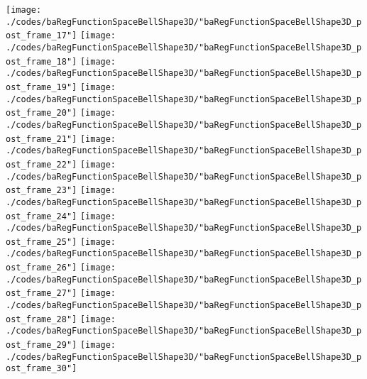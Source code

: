 \begin{frame}{\insertsection}
\begin{center}
{\begin{animateinline}{15}
				 \texttt{[image: ./codes/baRegFunctionSpaceBellShape3D/"baRegFunctionSpaceBellShape3D\_post\_frame\_17"]}\newframe
				 \texttt{[image: ./codes/baRegFunctionSpaceBellShape3D/"baRegFunctionSpaceBellShape3D\_post\_frame\_18"]}\newframe
				 \texttt{[image: ./codes/baRegFunctionSpaceBellShape3D/"baRegFunctionSpaceBellShape3D\_post\_frame\_19"]}\newframe
				 \texttt{[image: ./codes/baRegFunctionSpaceBellShape3D/"baRegFunctionSpaceBellShape3D\_post\_frame\_20"]}\newframe
				 \texttt{[image: ./codes/baRegFunctionSpaceBellShape3D/"baRegFunctionSpaceBellShape3D\_post\_frame\_21"]}\newframe
				 \texttt{[image: ./codes/baRegFunctionSpaceBellShape3D/"baRegFunctionSpaceBellShape3D\_post\_frame\_22"]}\newframe
				 \texttt{[image: ./codes/baRegFunctionSpaceBellShape3D/"baRegFunctionSpaceBellShape3D\_post\_frame\_23"]}\newframe
				 \texttt{[image: ./codes/baRegFunctionSpaceBellShape3D/"baRegFunctionSpaceBellShape3D\_post\_frame\_24"]}\newframe
				 \texttt{[image: ./codes/baRegFunctionSpaceBellShape3D/"baRegFunctionSpaceBellShape3D\_post\_frame\_25"]}\newframe
				 \texttt{[image: ./codes/baRegFunctionSpaceBellShape3D/"baRegFunctionSpaceBellShape3D\_post\_frame\_26"]}\newframe
				 \texttt{[image: ./codes/baRegFunctionSpaceBellShape3D/"baRegFunctionSpaceBellShape3D\_post\_frame\_27"]}\newframe
				 \texttt{[image: ./codes/baRegFunctionSpaceBellShape3D/"baRegFunctionSpaceBellShape3D\_post\_frame\_28"]}\newframe
				 \texttt{[image: ./codes/baRegFunctionSpaceBellShape3D/"baRegFunctionSpaceBellShape3D\_post\_frame\_29"]}\newframe
				 \texttt{[image: ./codes/baRegFunctionSpaceBellShape3D/"baRegFunctionSpaceBellShape3D\_post\_frame\_30"]}
			 \end{animateinline}
			}
	\end{center}
    
\end{frame}


